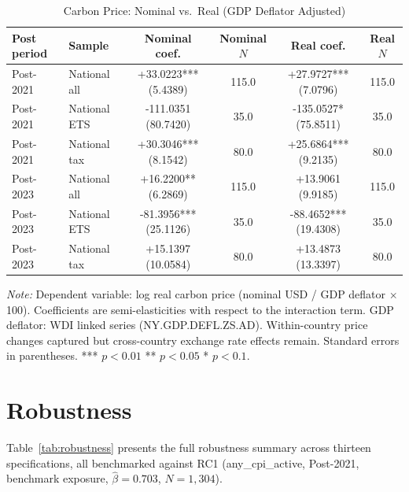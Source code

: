 \documentclass[12pt,a4paper]{article}
\begin{document}
\begin{table}[htbp]
\centering
\begin{threeparttable}
\caption{Carbon Price: Nominal vs.~Real (GDP Deflator Adjusted)}\label{tab:price_real}
\begin{tabular}{llcccc}
\toprule
Post period & Sample & Nominal coef. & Nominal $N$ & Real coef. & Real $N$ \\
\midrule
Post-2021 & National all & +33.0223*** (5.4389) & 115.0 & +27.9727*** (7.0796) & 115.0 \\
Post-2021 & National ETS & -111.0351 (80.7420) & 35.0 & -135.0527* (75.8511) & 35.0 \\
Post-2021 & National tax & +30.3046*** (8.1542) & 80.0 & +25.6864*** (9.2135) & 80.0 \\
Post-2023 & National all & +16.2200** (6.2869) & 115.0 & +13.9061 (9.9185) & 115.0 \\
Post-2023 & National ETS & -81.3956*** (25.1126) & 35.0 & -88.4652*** (19.4308) & 35.0 \\
Post-2023 & National tax & +15.1397 (10.0584) & 80.0 & +13.4873 (13.3397) & 80.0 \\
\bottomrule
\end{tabular}
\begin{tablenotes}\small
\item \textit{Note:} Dependent variable: log real carbon price (nominal USD / GDP deflator $\times$ 100). Coefficients are semi-elasticities with respect to the interaction term. GDP deflator: WDI linked series (NY.GDP.DEFL.ZS.AD). Within-country price changes captured but cross-country exchange rate effects remain. Standard errors in parentheses. *** $p<0.01$ ** $p<0.05$ * $p<0.1$.
\end{tablenotes}
\end{threeparttable}
\end{table}


\section{Robustness}\label{sec:robustness}

Table~\ref{tab:robustness} presents the full robustness summary across thirteen specifications, all benchmarked against RC1 (any\_cpi\_active, Post-2021, benchmark exposure, $\hat{\beta} = 0.703$, $N = 1{,}304$).
\end{document}
